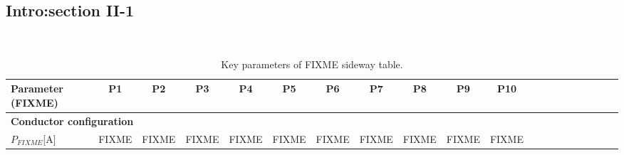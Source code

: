 \subsection{Intro:section II-1}
\lipsum[1-4]~\cite{anderson1964hard}

\begin{table}
	\renewcommand{\arraystretch}{1.2}
	\setlength{\tabcolsep}{5pt}
	\centering
	\footnotesize
	\begin{tabular}{l c c c c c c c c c c c c c c c c c c c}
	\hline
	Parameter (FIXME) & P1 & P2 & P3 & P4 & P5 & P6 & P7 & P8 & P9 & P10\\
	\hline
	\multicolumn{11}{l}{\textbf{Conductor configuration}}\\
	$P_{FIXME}$\hfill[A]& FIXME & FIXME & FIXME & FIXME & FIXME & FIXME & FIXME & FIXME & FIXME & FIXME\\
	\hline
	\end{tabular}
	\caption{Key parameters of FIXME sideway table.}
	\label{tbl2-2}
\end{table}